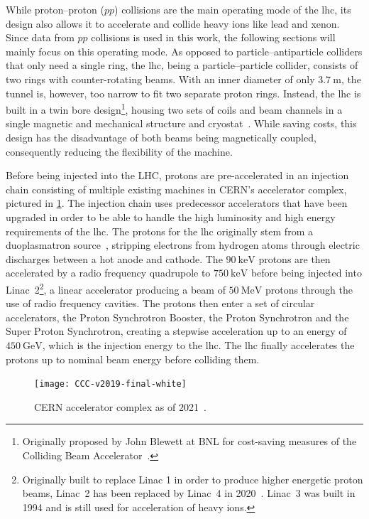 While proton--proton ($pp$) collisions are the main operating mode of the \gls{lhc}, its design also allows it to accelerate and collide heavy ions like lead and xenon.
Since data from $pp$ collisions is used in this work, the following sections will mainly focus on this operating mode.
As opposed to particle--antiparticle colliders that only need a single ring, the \gls{lhc}, being a particle--particle collider, consists of two rings with counter-rotating beams.
With an inner diameter of only $\SI{3.7}{\meter}$, the tunnel is, however, too narrow to fit two separate proton rings.
Instead, the \gls{lhc} is built in a twin bore design\footnote{Originally proposed by John Blewett at BNL for cost-saving measures of the Colliding Beam Accelerator~\cite{blewett1971proceedings,Evans:1129806}.}, housing two sets of coils and beam channels in a single magnetic and mechanical structure and cryostat~\cite{Bruning:782076}.
While saving costs, this design has the disadvantage of both beams being magnetically coupled, consequently reducing the flexibility of the machine. 

Before being injected into the LHC, protons are pre-accelerated in an injection chain consisting of multiple existing machines in CERN's accelerator complex, pictured in \cref{fig:accelerator_complex}. The injection chain uses predecessor accelerators that have been upgraded in order to be able to handle the high luminosity and high energy requirements of the \gls{lhc}.
The protons for the \gls{lhc} originally stem from a duoplasmatron source~\cite{Scrivens:1382102}, stripping electrons from hydrogen atoms through electric discharges between a hot anode and cathode.
The $\SI{90}{\keV}$ protons are then accelerated by a radio frequency quadrupole to $\SI{750}{\keV}$ before being injected into Linac~2\footnote{Originally built to replace Linac 1 in order to produce higher energetic proton beams, Linac~2 has been replaced by Linac~4 in 2020~\cite{linac4:2736208}. Linac~3 was built in 1994 and is still used for acceleration of heavy ions.}, a linear accelerator producing a beam of $\SI{50}{\MeV}$ protons through the use of radio frequency cavities.
The protons then enter a set of circular accelerators, the Proton Synchrotron Booster, the Proton Synchrotron and the Super Proton Synchrotron, creating a stepwise acceleration up to an energy of $\SI{450}{\GeV}$, which is the injection energy to the \gls{lhc}. The \gls{lhc} finally accelerates the protons up to nominal beam energy before colliding them. 

\begin{figure}
	\centering    
	\texttt{[image: CCC-v2019-final-white]}
	\caption[CERN accelerator complex]{CERN accelerator complex as of 2021~\cite{Mobs:2684277}.}
	\label{fig:accelerator_complex}
\end{figure}

